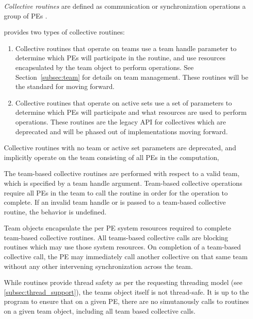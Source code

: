 \emph{Collective routines} are defined as  communication or synchronization
operations   a group of \acp{PE} .

{\color{Green}
\openshmem provides two types of collective routines:

\begin{enumerate}
\item Collective routines that operate on teams use a team handle parameter to determine
which \acp{PE} will participate in the routine, and use resources encapsulated by the team object
to perform operations. See Section~\ref{subsec:team} for details on team management.
These routines will be the standard for \openshmem moving forward.
\item Collective routines that operate on active sets use a set of parameters to determine
which \acp{PE} will participate and what resources are used to perform operations. These routines
are the legacy API for collectives which are deprecated and will be phased out of
implementations moving forward.
\end{enumerate}

Collective routines with no team or active set parameters are deprecated,
and implicitly operate on the team consisting of all \acp{PE} in the computation,

The team-based collective routines are performed with respect to a valid
\openshmem team, which is specified by a team handle argument.
Team-based collective operations require all \acp{PE} in the team to call
the routine in order for the operation to complete. If an invalid team handle
or  is passed to a team-based collective
routine, the behavior is undefined.

Team objects encapsulate the per \ac{PE} system resources required to complete
team-based collective routines.
All \openshmem teams-based collective calls are blocking routines which may use those
system resources. On completion of a team-based collective call, the \ac{PE} may
immediately call another collective on that same team without any other intervening
synchronization across the team.

While \openshmem routines provide thread safety as per the requesting threading model
(see \ref{subsec:thread_support}), the teams object itself is not thread-safe. It is up
to the program to ensure that on a given \ac{PE}, there are no simutanously calls to routines
on a given team object, including all team based collective calls.

}
